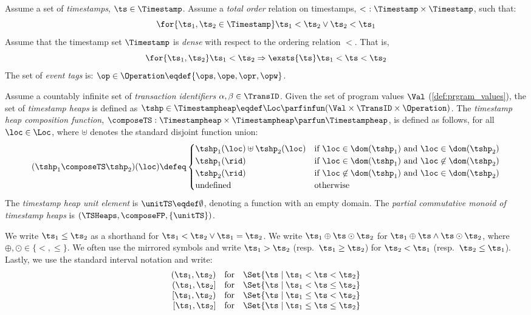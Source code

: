 \begin{definition}\label{def:timestamp_heaps}
Assume a set of \emph{timestamps}, $\ts \in \Timestamp$. Assume a \emph{total order} relation on timestamps, $<\ : \Timestamp \times \Timestamp$, such that:
%
\[
	\for{\ts_1, \ts_2 \in \Timestamp} \ts_1 < \ts_2 \lor \ts_2 < \ts_1
\]
%
Assume that the timestamp set $\Timestamp$ is \emph{dense} with respect to the ordering relation $<$. That is,
\[
	\for{\ts_1, \ts_2} \ts_1 < \ts_2 
	\Rightarrow 
	\exsts{\ts} \ts_1 < \ts < \ts_2	
\]
%
The set of \emph{event tags} is: $\op \in \Operation \eqdef \{\ops, \ope, \opr, \opw \}$. 

\noindent Assume a countably infinite set of \emph{transaction identifiers} $\alpha, \beta \in \TransID$.
Given the set of program values $\Val$ (\ref{def:prgram_values}), the set of \emph{timestamp heaps} is defined as $\tshp \in \Timestampheap \eqdef \Loc \parfinfun (\Val \times \TransID \times \Operation)$.
The \emph{timestamp heap composition function}, $\composeTS: \Timestampheap \times \Timestampheap \parfun \Timestampheap$, is defined as follows, for all $\loc \in \Loc$, where $\uplus$ denotes the standard disjoint function union:
%
\[
	(\tshp_1 \composeTS \tshp_2)(\loc) \defeq 
	\begin{cases}
		\tshp_1(\loc) \uplus \tshp_2(\loc) & \text{if } \loc \in \dom(\tshp_1) \text{ and } \loc \in \dom(\tshp_2) \\
		\tshp_1(\rid) & \text{if } \loc \in \dom(\tshp_1) \text{ and } \loc \not\in \dom(\tshp_2) \\
		\tshp_2(\rid) & \text{if } \loc \not\in \dom(\tshp_1) \text{ and } \loc \in \dom(\tshp_2) \\
		\text{undefined} & \text{otherwise}
	\end{cases}
\]
%
The \emph{timestamp heap unit element} is $\unitTS \eqdef \emptyset$, denoting a function with an empty domain.
The \emph{partial commutative monoid of timestamp heaps} is $(\TSHeaps, \composeFP, \{\unitTS\})$. 
\end{definition}
%
%
We write $\ts_1 \leq \ts_2$ as a shorthand for $\ts_1 < \ts_2 \lor \ts_1 = \ts_2$.
We write $\ts_1 \oplus \ts \odot \ts_2 $ for $\ts_1 \oplus \ts \land \ts \odot \ts_2 $, where $\oplus, \odot \in \{<, \leq\}$.
We often use the mirrored symbols and write $\ts_1 > \ts_2$ (resp.~$\ts_1 \geq \ts_2$) for $\ts_2 < \ts_1$ (resp.~$\ts_2 \leq \ts_1$).
Lastly, we use the standard interval notation and write:
%
\[
\begin{array}{r @{\hspace{10pt}} c @{\hspace{10pt}} l}
	(\ts_1, \ts_2) & \text{for} & \Set{\ts \mid \ts_1 < \ts < \ts_2 } \\
	(\ts_1, \ts_2] & \text{for} & \Set{\ts \mid \ts_1 < \ts \leq \ts_2 } \\
	{[\ts_1, \ts_2)} & \text{for} & \Set{\ts \mid \ts_1 \leq \ts < \ts_2 } \\	
	{[\ts_1, \ts_2]} & \text{for} & \Set{\ts \mid \ts_1 \leq \ts \leq \ts_2 } 
\end{array}
\]
%

